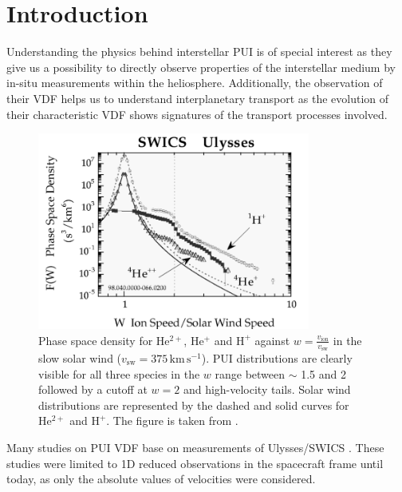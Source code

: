 
\chapter{Introduction} %

\label{chap:intro} %



Understanding the physics behind interstellar PUI is of special interest as they give us a possibility to directly observe properties of the interstellar medium by in-situ measurements within the heliosphere. 
Additionally, the observation of their VDF helps us to understand interplanetary transport as the evolution of their characteristic VDF shows signatures of the transport processes involved.
\begin{figure}[h]
	\includegraphics[width=0.8\textwidth]{Figures/sw_pui_gloeckler.png}
	\centering
	\caption{Phase space density for $\mathrm{He^{2+}}$, $\mathrm{He^{+}}$ and $\mathrm{H^{+}}$ against $w = \frac{v_\mathrm{ion}}{v_\mathrm{sw}}$ in the slow solar wind ($v_\mathrm{sw} = 375\,\mathrm{km\,s^{-1}}$). PUI distributions are clearly visible for all three species in the $w$ range between $\sim$ 1.5 and 2 followed by a cutoff at $w = 2$ and high-velocity tails. Solar wind distributions are represented by the dashed and solid curves for $\mathrm{He^{2+}}$ and $\mathrm{H^{+}}$. The figure is taken from \citet{gloeckler1999}.} 
	\label{fig:gloeckler}
\end{figure}
Many studies on PUI VDF base on measurements of Ulysses/SWICS \citep[s.][]{gloeckler_geiss}.
These studies were limited to 1D reduced observations in the spacecraft frame until today, as only the absolute values of velocities were considered.
